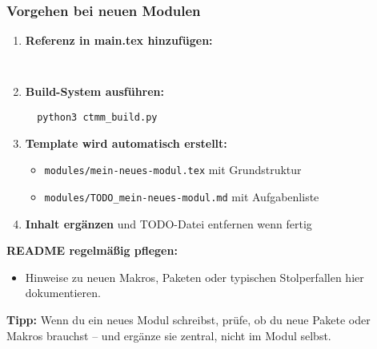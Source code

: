 \hypertarget{vorgehen-bei-neuen-modulen}{%
\subsubsection{Vorgehen bei neuen Modulen}\label{vorgehen-bei-neuen-modulen}}

\begin{enumerate}
\def\labelenumi{\arabic{enumi}.}
\tightlist
\item
  \textbf{Referenz in main.tex hinzufügen:}
  \begin{verbatim}
  
  \end{verbatim}
\item
  \textbf{Build-System ausführen:}
  \begin{verbatim}
  python3 ctmm_build.py
  \end{verbatim}
\item
  \textbf{Template wird automatisch erstellt:}
  \begin{itemize}
  \tightlist
  \item
    \texttt{modules/mein-neues-modul.tex} mit Grundstruktur
  \item
    \texttt{modules/TODO\_mein-neues-modul.md} mit Aufgabenliste
  \end{itemize}
\item
  \textbf{Inhalt ergänzen} und TODO-Datei entfernen wenn fertig
\end{enumerate}

\textbf{README regelmäßig pflegen:}
\begin{itemize}
\tightlist
\item
  Hinweise zu neuen Makros, Paketen oder typischen Stolperfallen hier dokumentieren.
\end{itemize}

\textbf{Tipp:}
Wenn du ein neues Modul schreibst, prüfe, ob du neue Pakete oder Makros brauchst -- und ergänze sie zentral, nicht im Modul selbst.